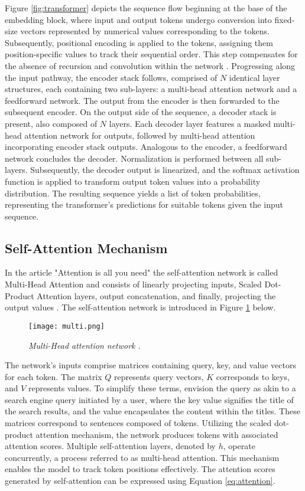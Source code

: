 Figure \ref{fig:transformer} depicts the sequence flow beginning at the base of the embedding block, where input and output tokens undergo conversion into fixed-size vectors represented by numerical values corresponding to the tokens. Subsequently, positional encoding is applied to the tokens, assigning them position-specific values to track their sequential order. This step compensates for the absence of recursion and convolution within the network \cite{vaswani2023attention}. Progressing along the input pathway, the encoder stack follows, comprised of \(N\) identical layer structures, each containing two sub-layers: a multi-head attention network and a feedforward network. The output from the encoder is then forwarded to the subsequent encoder. On the output side of the sequence, a decoder stack is present, also composed of \(N\) layers. Each decoder layer features a masked multi-head attention network for outputs, followed by multi-head attention incorporating encoder stack outputs. Analogous to the encoder, a feedforward network concludes the decoder. Normalization is performed between all sub-layers. Subsequently, the decoder output is linearized, and the softmax activation function is applied to transform output token values into a probability distribution. The resulting sequence yields a list of token probabilities, representing the transformer's predictions for suitable tokens given the input sequence.

\subsection{Self-Attention Mechanism}

In the article "Attention is all you need" the self-attention network is called Multi-Head Attention and consists of linearly projecting inputs, Scaled Dot-Product Attention layers,
output concatenation, and finally, projecting the output values \cite{vaswani2023attention}. The self-attention network is introduced in Figure \ref{fig:multi} below.

\begin{figure}[H]
    \centering
    \texttt{[image: multi.png]}
    \caption{
        \it{Multi-Head attention network \cite{vaswani2023attention}.}
    }
    \label{fig:multi}
\end{figure}

The network's inputs comprise matrices containing query, key, and value vectors for each token. The matrix \(Q\) represents query vectors, \(K\) corresponds to keys, and \(V\) represents values. To simplify these terms, envision the query as akin to a search engine query initiated by a user, where the key value signifies the title of the search results, and the value encapsulates the content within the titles. These matrices correspond to sentences composed of tokens. Utilizing the scaled dot-product attention mechanism, the network produces tokens with associated attention scores. Multiple self-attention layers, denoted by \(h\), operate concurrently, a process referred to as multi-head attention. This mechanism enables the model to track token positions effectively. The attention scores generated by self-attention can be expressed using Equation \ref{eq:attention}.

